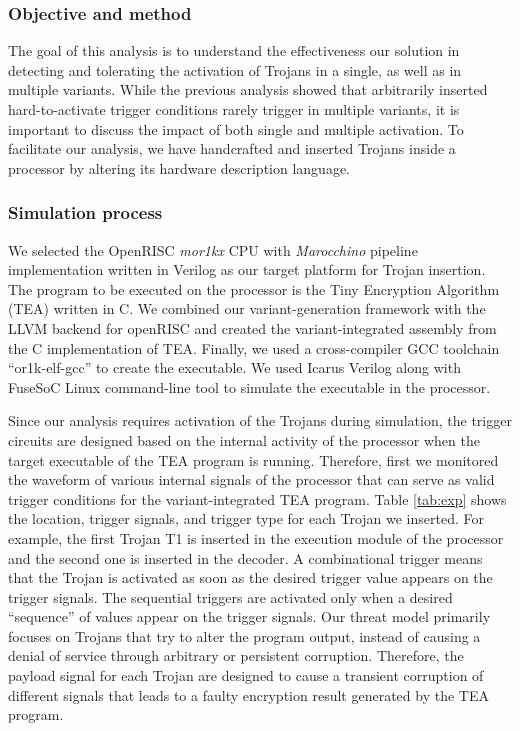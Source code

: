 \documentclass[conference]{IEEEtran}
\begin{document}
\label{sec:det_res}
\subsubsection{Objective and method} The goal of this analysis is to understand the effectiveness our solution in detecting and tolerating the activation of Trojans in a single, as well as in multiple variants. 
While the previous analysis showed that arbitrarily inserted hard-to-activate trigger conditions rarely trigger in multiple variants, it is important to discuss the impact of both single and multiple activation. 
To facilitate our analysis, we have handcrafted and inserted Trojans inside a processor by altering its hardware description language. %

\subsubsection{Simulation process}
We selected the OpenRISC \textit{mor1kx} CPU with \textit{Marocchino} pipeline implementation written in Verilog as our target platform for Trojan insertion. The program to be executed on the processor is the Tiny Encryption Algorithm (TEA) written in C. We combined our variant-generation framework with the  LLVM backend for openRISC and created the variant-integrated assembly from the C implementation of TEA. Finally, we used a cross-compiler GCC toolchain “or1k-elf-gcc” to create the executable.
We used Icarus Verilog along with FuseSoC Linux command-line tool to simulate the  executable in the processor.

Since our analysis requires activation of the Trojans during simulation, the trigger circuits are designed based on the internal activity of the processor when the target executable of the TEA program is running. Therefore, first we monitored the waveform of various internal signals of the processor that can serve as valid trigger conditions for the variant-integrated TEA program. Table \ref{tab:exp} shows the location, trigger signals, and trigger type for each Trojan we inserted. For example, the first Trojan T1 is inserted in the execution module of the processor and the second one is inserted in the decoder. A combinational trigger means that the Trojan is activated as soon as the desired trigger value appears on the trigger signals. The sequential triggers are activated only when a desired ``sequence'' of values appear on the trigger signals. Our threat model primarily focuses on Trojans that try to alter the program output, instead of causing a denial of service through arbitrary or persistent corruption. Therefore, the payload signal for each Trojan are designed to cause a transient corruption of different signals that leads to a faulty encryption result generated by the TEA program. %
\end{document}
